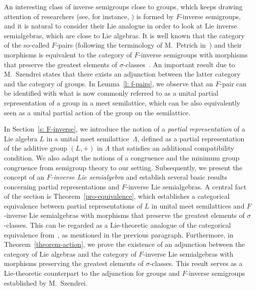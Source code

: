 \documentclass{amsart}
\newcommand{\0}{{\vartheta}}
\theoremstyle{definition}
\theoremstyle{remark}
\numberwithin{equation}{section}
\newtheorem*{Theorem A}{\textbf{Theorem A}}
\newtheorem*{Corollary E}{\textbf{Corollary E}}
\newtheorem*{Corollary F}{\textbf{Corollary F}}
\newtheorem*{Theorem B}{\textbf{Theorem B}}
\newtheorem*{Theorem C}{\textbf{Theorem C}}
\newtheorem*{Theorem D}{\textbf{Theorem B}}
\newtheorem*{p a}{\textbf{Proof of  Theorem A}}
\newtheorem*{p b}{\textbf{Proof of Theorem B}}
\newtheorem*{p c}{\textbf{Proof of  Theorem C}}
\newtheorem*{p d}{\textbf{Proof of  Theorem D}}
\begin{document}
 An interesting class of inverse semigroups close to groups, which keeps drawing attention  of researchers (see, for instance, \cite{KudFur}) is formed by  $F$-inverse semigroups, and it is natural to consider their Lie  analogue in order to look at Lie inverse   semialgebras, which are close to Lie algebras. It is well known that the category of the so-called $F$-pairs (following the terminology of M.~Petrich in~\cite{Petrich1984}) and their morphisms is equivalent to the category of $F$-inverse semigroups with morphisms that preserve the greatest elements of $\sigma$-classes~\cite[VII.6]{Petrich1984}. An important result due to  M.~Szendrei \cite{Szendrei}  states that there exists an adjunction between  the latter category and the category of groups. In Lemma~\ref{l: f-pairs}, we observe that an $F$-pair can be identified with what is now commonly referred to as a unital partial representation of a group in a meet semilattice,  which can  be also equivalently seen as a unital partial action of the group on the semilattice. 

In Section~\ref{s: F-inverse}, we introduce the notion of a {\em partial representation} of a Lie algebra $L$ in a unital meet semilattice~$\Lambda$, defined as a partial representation of the additive group $(L,+)$ in $\Lambda$ that satisfies an additional compatibility condition. We also adapt the notions of 
 a congruence and the minimum group congruence from semigroup theory to our setting. Subsequently, we present the concept of an {\em $F$-inverse Lie semialgebra} and establish several  basic results concerning partial  representations and $F$-inverse Lie semialgebras. A central  fact of the section is Theorem~\ref{pro-equivalence}, which establishes a categorical equivalence between partial representations of $L$ in unital meet semilattices and $F$-inverse Lie semialgebras with morphisms that preserve the greatest elements of $\sigma$-classes. This can be regarded as a Lie-theoretic analogue of the categorical equivalence from~\cite[VII.6]{Petrich1984}, as  mentioned in the previous paragraph. Furthermore, in Theorem~\ref{theorem-action}, we prove the existence of an adjunction between the category of Lie algebras and the category of $F$-inverse Lie semialgebras with morphisms preserving the greatest elements of $\sigma$-classes. This result serves as a Lie-theoretic counterpart to the adjunction for groups and $F$-inverse semigroups established by M.~Szendrei.
\end{document}
